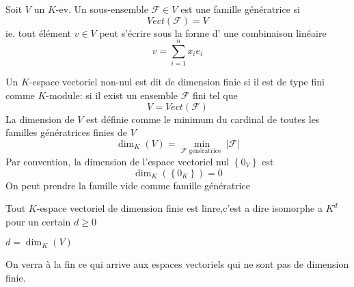 \documentclass[../main.tex]{subfiles}
\begin{document}
\begin{defn}\label{defn:famille_generatrice}
	Soit $V$ un $K$-ev. Un sous-ensemble $\mathcal{F}\in V$ est une famille génératrice si
	\[ 
		Vect( \mathcal{F}) = V
	\]
	ie. tout élément $v \in V$ peut s'écrire sous la forme d' une combinaison linéaire
	\[ 
	v= \sum_{i=1}^{ n}x_i e_i
	\]
	
\end{defn}

\begin{defn}\label{defn:espace_vectoriel_fini}
	Un $K$-espace vectoriel non-nul est dit de dimension finie si il est de type fini comme $K$-module: si il exist un ensemble $\mathcal{F}$ fini tel que
	\[ 
		V= Vect( \mathcal{F})
	\]
	La dimension de $V$ est définie comme le minimum du cardinal de toutes les familles génératrices finies de $V$ 
	\[ 
		\dim_K(V)= \min_{\mathcal{F} \text{ genératrice } } | \mathcal{F}|
	\]
	Par convention, la dimension de l'espace vectoriel nul $ \left\{ 0_V \right\} $ est
	\[ 
		\dim_K( \left\{ 0_K \right\} )=0
	\]
	On peut prendre la famille vide comme famille génératrice
\end{defn}
\begin{thm}
	Tout $K$-espace vectoriel de dimension finie est linre,c'est a dire isomorphe a $K^{d}$ pour un certain $d \geq 0$
\end{thm}
\begin{rmq}
	$d=\dim_K(V)$
\end{rmq}
\begin{rmq}
	On verra à la fin ce qui arrive aux espaces vectoriels qui ne sont pas de dimension finie.
\end{rmq}
\end{document}
